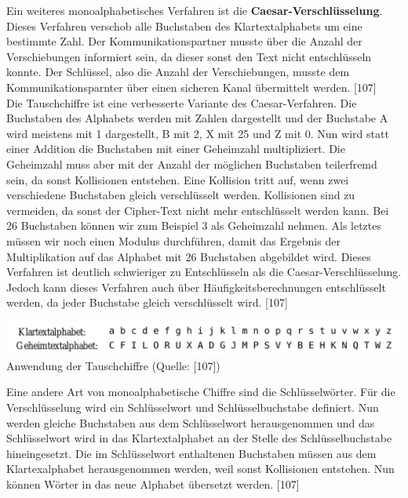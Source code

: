 \documentclass[12pt,a4paper]{report}
\begin{document}
\begin{onehalfspace}
Ein weiteres monoalphabetisches Verfahren ist die \textbf{Caesar-Verschlüsselung}. Dieses Verfahren verschob alle Buchstaben des Klartextalphabets um eine bestimmte Zahl. Der Kommunikationspartner musste über die Anzahl der Verschiebungen informiert sein, da dieser sonst den Text nicht entschlüsseln konnte. Der Schlüssel, also die Anzahl der Verschiebungen, musste dem Kommunikationsparnter über einen sicheren Kanal übermittelt werden. [107]\\

Die Tauschchiffre ist eine verbesserte Variante des Caesar-Verfahren. Die Buchstaben des Alphabets werden mit Zahlen dargestellt und der Buchstabe A wird meistens mit 1 dargestellt, B mit 2, X mit 25 und Z mit 0. Nun wird statt einer Addition die Buchstaben mit einer Geheimzahl multipliziert. Die Geheimzahl muss aber mit der Anzahl der möglichen Buchstaben teilerfremd sein, da sonst Kollisionen entstehen. Eine Kollision tritt auf, wenn zwei verschiedene Buchstaben gleich verschlüsselt werden. Kollisionen sind zu vermeiden, da sonst der Cipher-Text nicht mehr entschlüsselt werden kann. Bei 26 Buchstaben können wir zum Beispiel 3 als Geheimzahl nehmen. Als letztes müssen wir noch einen Modulus durchführen, damit das Ergebnis der Multiplikation auf das Alphabet mit 26 Buchstaben abgebildet wird. Dieses Verfahren ist deutlich schwieriger zu Entschlüsseln als die Caesar-Verschlüsselung. Jedoch kann dieses Verfahren auch über Häufigkeitsberechnungen entschlüsselt werden, da jeder Buchstabe gleich verschlüsselt wird. [107]\\

\begin{center}
\includegraphics[scale=0.35]{img/tauschchiffre.png}\\
Anwendung der Tauschchiffre (Quelle: [107])
\end{center}

Eine andere Art von monoalphabetische Chiffre sind die Schlüsselwörter. Für die Verschlüsselung wird ein Schlüsselwort und Schlüsselbuchstabe definiert. Nun werden gleiche Buchstaben aus dem Schlüsselwort herausgenommen und das Schlüsselwort wird in das Klartextalphabet an der Stelle des Schlüsselbuchstabe hineingesetzt. Die im Schlüsselwort enthaltenen Buchstaben müssen aus dem Klartexalphabet herausgenommen werden, weil sonst Kollisionen entstehen. Nun können Wörter in das neue Alphabet übersetzt werden. [107]


\end{onehalfspace}
\end{document}
